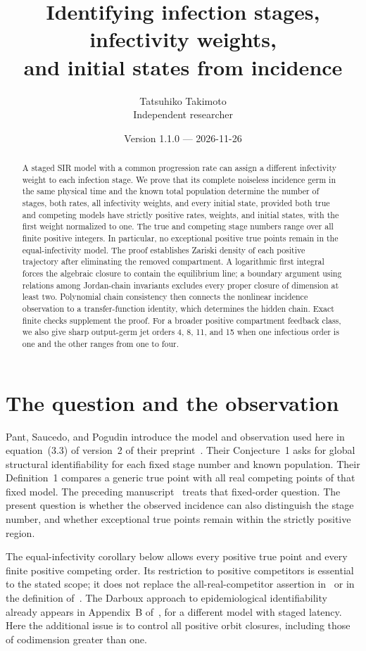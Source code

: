 \documentclass[11pt]{article}
\title{Identifying infection stages, infectivity weights,\\and initial states from incidence}
\author{Tatsuhiko Takimoto\\Independent researcher}
\date{Version 1.1.0 --- 2026-11-26}
\theoremstyle{remark}\newtheorem{remark}[theorem]{Remark}
\begin{document}
\maketitle
\begin{abstract}
A staged SIR model with a common progression rate can assign a different infectivity weight to each infection stage. We prove that its complete noiseless incidence germ in the same physical time and the known total population determine the number of stages, both rates, all infectivity weights, and every initial state, provided both true and competing models have strictly positive rates, weights, and initial states, with the first weight normalized to one. The true and competing stage numbers range over all finite positive integers. In particular, no exceptional positive true points remain in the equal-infectivity model. The proof establishes Zariski density of each positive trajectory after eliminating the removed compartment. A logarithmic first integral forces the algebraic closure to contain the equilibrium line; a boundary argument using relations among Jordan-chain invariants excludes every proper closure of dimension at least two. Polynomial chain consistency then connects the nonlinear incidence observation to a transfer-function identity, which determines the hidden chain. Exact finite checks supplement the proof. For a broader positive compartment feedback class, we also give sharp output-germ jet orders 4, 8, 11, and 15 when one infectious order is one and the other ranges from one to four.
\end{abstract}

\section{The question and the observation}
Pant, Saucedo, and Pogudin introduce the model and observation used here in equation~(3.3) of version~2 of their preprint~\cite{PSP}. Their Conjecture~1 asks for global structural identifiability for each fixed stage number and known population. Their Definition~1 compares a generic true point with all real competing points of that fixed model. The preceding manuscript~\cite{Fixed} treats that fixed-order question. The present question is whether the observed incidence can also distinguish the stage number, and whether exceptional true points remain within the strictly positive region.

The equal-infectivity corollary below allows every positive true point and every finite positive competing order. Its restriction to positive competitors is essential to the stated scope; it does not replace the all-real-competitor assertion in~\cite{Fixed} or in the definition of~\cite{PSP}. The Darboux approach to epidemiological identifiability already appears in Appendix~B of~\cite{PSP}, for a different model with staged latency. Here the additional issue is to control all positive orbit closures, including those of codimension greater than one.
\end{document}
